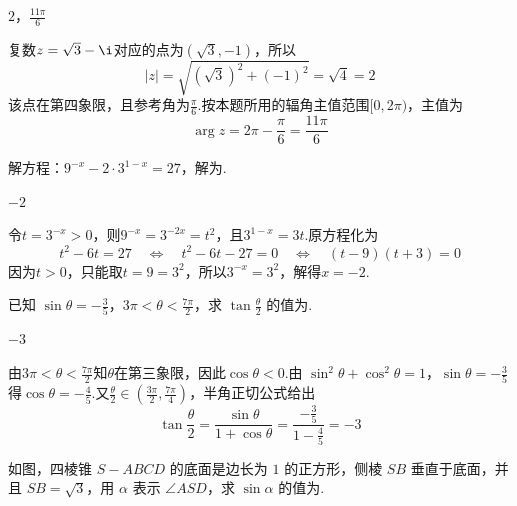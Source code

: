 \begin{answer}
\(2\)，\(\frac{11\pi}{6}\)
\end{answer}

\begin{solution}
复数\(z=\sqrt{3}-\i\)对应的点为\((\sqrt{3},-1)\)，所以
\[
|z|=\sqrt{(\sqrt{3})^2+(-1)^2}=\sqrt4=2
\]
该点在第四象限，且参考角为\(\frac{\pi}{6}\).按本题所用的辐角主值范围\([0,2\pi)\)，主值为
\[
\arg z=2\pi-\frac{\pi}{6}=\frac{11\pi}{6}
\]
\end{solution}

\begin{problem}

解方程：\(9^{-x} - 2 \cdot 3^{1 - x} = 27\)，解为\fillinblank{}.
\end{problem}

\begin{answer}
\(-2\)
\end{answer}

\begin{solution}
令\(t=3^{-x}>0\)，则\(9^{-x}=3^{-2x}=t^2\)，且\(3^{1-x}=3t\).原方程化为
\[
t^2-6t=27
\quad\Longleftrightarrow\quad
t^2-6t-27=0
\quad\Longleftrightarrow\quad
(t-9)(t+3)=0
\]
因为\(t>0\)，只能取\(t=9=3^2\)，所以\(3^{-x}=3^2\)，解得\(x=-2\).
\end{solution}

\begin{problem}

已知 \(\sin \theta = -\frac{3}{5}\)，\(3\pi < \theta < \frac{7\pi}{2}\)，求 \(\tan \frac{\theta}{2}\) 的值为\fillinblank{}.
\end{problem}

\begin{answer}
\(-3\)
\end{answer}

\begin{solution}
由\(3\pi<\theta<\frac{7\pi}{2}\)知\(\theta\)在第三象限，因此\(\cos\theta<0\).由
\(\sin^2\theta+\cos^2\theta=1\)，\(\sin\theta=-\frac35\)
得\(\cos\theta=-\frac45\).又\(\frac{\theta}{2}\in(\frac{3\pi}{2},\frac{7\pi}{4})\)，半角正切公式给出
\[
\tan\frac{\theta}{2}=\frac{\sin\theta}{1+\cos\theta}
=\frac{-\frac35}{1-\frac45}=-3
\]
\end{solution}

\begin{problem}

如图，四棱锥 \(S-ABCD\) 的底面是边长为 \(1\) 的正方形，侧棱 \(SB\) 垂直于底面，并且 \(SB=\sqrt{3}\)，用 \(\alpha\) 表示 \(\angle ASD\)，求 \(\sin \alpha\) 的值为\fillinblank{}.

\end{problem}

